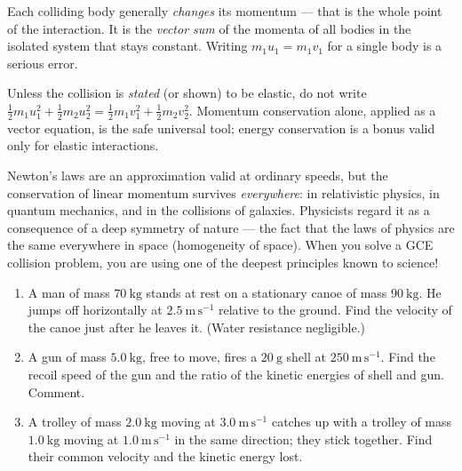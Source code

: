 \documentclass[11pt]{article}
\begin{document}
\begin{attention}
Each colliding body generally \emph{changes} its momentum — that is the whole point of the interaction. It is the \emph{vector sum} of the momenta of all bodies in the isolated system that stays constant. Writing $m_1u_1 = m_1v_1$ for a single body is a serious error.
\end{attention}

\begin{attention}
Unless the collision is \emph{stated} (or shown) to be elastic, do not write $\tfrac12 m_1u_1^2+\tfrac12 m_2u_2^2 = \tfrac12 m_1v_1^2+\tfrac12 m_2v_2^2$. Momentum conservation alone, applied as a vector equation, is the safe universal tool; energy conservation is a bonus valid only for elastic interactions.
\end{attention}

\begin{savaistu}
Newton's laws are an approximation valid at ordinary speeds, but the conservation of linear momentum survives \emph{everywhere}: in relativistic physics, in quantum mechanics, and in the collisions of galaxies. Physicists regard it as a consequence of a deep symmetry of nature — the fact that the laws of physics are the same everywhere in space (homogeneity of space). When you solve a GCE collision problem, you are using one of the deepest principles known to science!
\end{savaistu}

\begin{exercice}[Practice]
\begin{enumerate}
\item A man of mass $70\ \mathrm{kg}$ stands at rest on a stationary canoe of mass $90\ \mathrm{kg}$. He jumps off horizontally at $2.5\ \mathrm{m\,s^{-1}}$ relative to the ground. Find the velocity of the canoe just after he leaves it. (Water resistance negligible.)
\item A gun of mass $5.0\ \mathrm{kg}$, free to move, fires a $20\ \mathrm{g}$ shell at $250\ \mathrm{m\,s^{-1}}$. Find the recoil speed of the gun and the ratio of the kinetic energies of shell and gun. Comment.
\item A trolley of mass $2.0\ \mathrm{kg}$ moving at $3.0\ \mathrm{m\,s^{-1}}$ catches up with a trolley of mass $1.0\ \mathrm{kg}$ moving at $1.0\ \mathrm{m\,s^{-1}}$ in the same direction; they stick together. Find their common velocity and the kinetic energy lost.
\end{enumerate}
\end{exercice}
\end{document}
